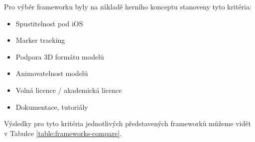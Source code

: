 \documentclass[twoside,12pt]{article}
\begin{document}
Pro výběr frameworku byly na základě herního konceptu stanoveny tyto kritéria:
\begin{itemize}
	\item Spustitelnost pod iOS
	\item Marker tracking
	\item Podpora 3D formátu modelů
	\item Animovatelnost modelů
	\item Volná licence / akademická licence
	\item Dokumentace, tutoriály
\end{itemize}

Výsledky pro tyto kritéria jednotlivých představených frameworků můžeme vidět v Tabulce \ref{table:frameworks-compare}.

\end{document}
